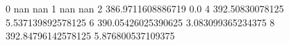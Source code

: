 0 nan nan
1 nan nan
2 386.9711608886719 0.0
4 392.50830078125 5.537139892578125
6 390.05426025390625 3.083099365234375
8 392.84796142578125 5.876800537109375
